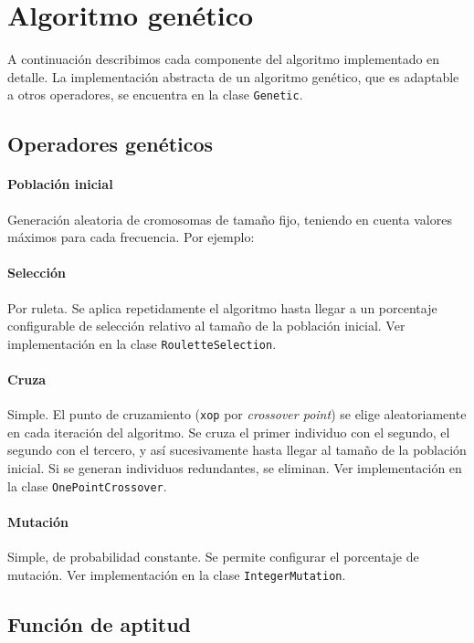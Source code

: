 \documentclass[a4paper,12pt]{article}
\begin{document}
\section{Algoritmo genético}

A continuación describimos cada componente del algoritmo implementado en detalle.
La implementación abstracta de un algoritmo genético, que es adaptable a otros operadores, se encuentra en la clase \texttt{Genetic}.

\subsection{Operadores genéticos}

\paragraph{Población inicial} Generación aleatoria de cromosomas de tamaño fijo, teniendo en cuenta valores máximos para cada frecuencia.
Por ejemplo:



\paragraph{Selección} Por ruleta. Se aplica repetidamente el algoritmo hasta llegar a un porcentaje configurable de selección relativo al tamaño de la población inicial.
Ver implementación en la clase \texttt{RouletteSelection}.

\paragraph{Cruza} Simple.
El punto de cruzamiento (\texttt{xop} por \textit{\foreignlanguage{english}{crossover point}}) se elige aleatoriamente en cada iteración del algoritmo.
Se cruza el primer individuo con el segundo, el segundo con el tercero, y así sucesivamente hasta llegar al tamaño de la población inicial.
Si se generan individuos redundantes, se eliminan.
Ver implementación en la clase \texttt{OnePointCrossover}.

\paragraph{Mutación} Simple, de probabilidad constante. Se permite configurar el porcentaje de mutación.
Ver implementación en la clase \texttt{IntegerMutation}.

\subsection{Función de aptitud}
\end{document}
